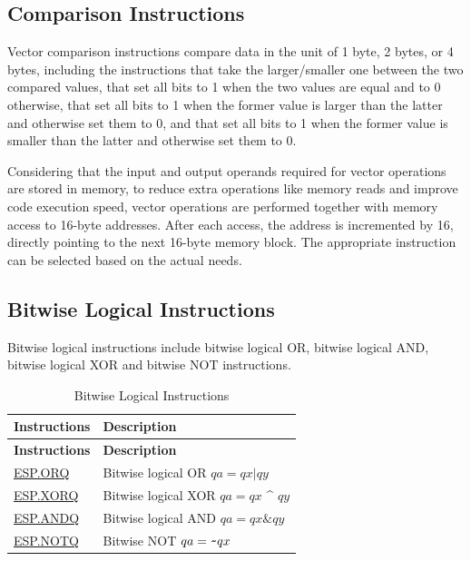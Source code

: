 \documentclass[main\_\_EN.tex]{subfiles}
\begin{document}
\subsection{Comparison Instructions}
\label{sec:pie-comparison-instructions}

Vector comparison instructions compare data in the unit of 1 byte, 2 bytes, or 4 bytes, including the instructions that take the larger/smaller one between the two compared values, that set all bits to 1 when the two values are equal and to 0 otherwise, that set all bits to 1 when the former value is larger than the latter and otherwise set them to 0, and that set all bits to 1 when the former value is smaller than the latter and otherwise set them to 0.

Considering that the input and output operands required for vector operations are stored in memory, to reduce extra operations like memory reads and improve code execution speed, vector operations are performed together with memory access to 16-byte addresses. After each access, the address is incremented by 16, directly pointing to the next 16-byte memory block. The appropriate instruction can be selected based on the actual needs.




\subsection{Bitwise Logical Instructions}
\label{sec:pie-bitwise-logic-instructions}

Bitwise logical instructions include bitwise logical OR, bitwise logical AND, bitwise logical XOR and bitwise NOT instructions.

\begin{longtable}[c]{|l|m{10cm}|}
    \caption{Bitwise Logical Instructions}
    \label{tab:pie-bitwise-logic-instructions}\\
    \hline
    \rowcolor{lightgray}
    \textbf{Instructions} & \textbf{Description} \\\hline
    \endfirsthead
    \rowcolor{lightgray}
    \textbf{Instructions} & \textbf{Description} \\\hline
    \endhead
    \endfoot

    \hyperref[instruction:ESPORQ]{ESP.ORQ} & Bitwise logical OR $qa = qx | qy$
    \\\hline
    \hyperref[instruction:ESPXORQ]{ESP.XORQ} & Bitwise logical XOR $qa = qx$ \^{} $qy$
    \\\hline
    \hyperref[instruction:ESPANDQ]{ESP.ANDQ} & Bitwise logical AND $qa = qx \& qy$
    \\\hline
    \hyperref[instruction:ESPNOTQ]{ESP.NOTQ} & Bitwise NOT $qa =\verb+~+ qx$
    \\\hline
\end{longtable}
\end{document}
